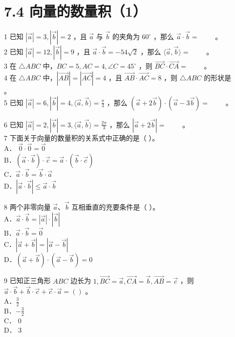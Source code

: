 \documentclass[10pt]{article}
\begin{document}
\section*{7.4 向量的数量积（1）}
1 已知 \(|\vec{a}|=3,|\vec{b}|=2\) ，且 \(\vec{a}\) 与 \(\vec{b}\) 的夹角为 \(60^{\circ}\) ，那么 \(\vec{a} \cdot \vec{b}=\) \(\qquad\)。\\
2 已知 \(|\vec{a}|=12,|\vec{b}|=9\) ，且 \(\vec{a} \cdot \vec{b}=-54 \sqrt{2}\) ，那么 \(\langle\vec{a}, \vec{b}\rangle=\) \(\qquad\)。\\
3 在 \(\triangle A B C\) 中，\(B C=5, A C=4, \angle C=45^{\circ}\) ，则 \(\overrightarrow{B C} \cdot \overrightarrow{C A}=\) \(\qquad\)。\\
4 在 \(\triangle A B C\) 中，\(|\overrightarrow{A B}|=|\overrightarrow{A C}|=4\) ，且 \(\overrightarrow{A B} \cdot \overrightarrow{A C}=8\) ，则 \(\triangle A B C\) 的形状是 \(\qquad\)。\\
5 已知 \(|\vec{a}|=6,|\vec{b}|=4,\langle\vec{a}, \vec{b}\rangle=\frac{\pi}{3}\) ，那么 \((\vec{a}+2 \vec{b}) \cdot(\vec{a}-3 \vec{b})=\) \(\qquad\)。

6 已知 \(|\vec{a}|=2,|\vec{b}|=3,\langle\vec{a}, \vec{b}\rangle=\frac{2 \pi}{3}\) ，那么 \(|\vec{a}+2 \vec{b}|=\) \(\qquad\)。\\
7 下面关于向量的数量积的关系式中正确的是（ ）。\\
A． \(\overrightarrow{0} \cdot \overrightarrow{0}=\overrightarrow{0}\)\\
B．\((\vec{a} \cdot \vec{b}) \cdot \vec{c}=\vec{a} \cdot(\vec{b} \cdot \vec{c})\)\\
C．\(\vec{a} \cdot \vec{b}=\vec{b} \cdot \vec{a}\)\\
D．\(|\vec{a} \cdot \vec{b}| \leqslant \vec{a} \cdot \vec{b}\)

8 两个非零向量 \(\vec{a} 、 \vec{b}\) 互相垂直的充要条件是（ ）。\\
A．\(\vec{a} \cdot \vec{b}=|\vec{a}| \cdot|\vec{b}|\)\\
B．\(\vec{a} \cdot \vec{b}=\overrightarrow{0}\)\\
C．\(|\vec{a}+\vec{b}|=|\vec{a}-\vec{b}|\)\\
D．\((\vec{a}+\vec{b}) \cdot(\vec{a}-\vec{b})=0\)

9 已知正三角形 \(A B C\) 边长为 \(1, \overrightarrow{B C}=\vec{a}, \overrightarrow{C A}=\vec{b}, \overrightarrow{A B}=\vec{c}\) ，则 \(\vec{a} \cdot \vec{b}+\vec{b} \cdot \vec{c}+\vec{c} \cdot \vec{a}=()\) 。\\
A．\(\frac{3}{2}\)\\
B．\(-\frac{3}{2}\)\\
C． 0\\
D． 3
\end{document}

